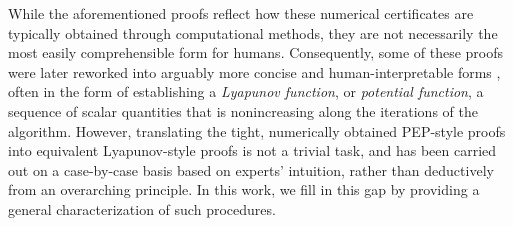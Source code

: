\documentclass{article}
\theoremstyle{definition}
\theoremstyle{plain}
\begin{document}
While the aforementioned proofs reflect how these numerical certificates are typically obtained through computational methods, they are not necessarily the most easily comprehensible form for humans.
Consequently, some of these proofs were later reworked into arguably more concise and human-interpretable forms \citep{dAspremontScieurTaylor2021_acceleration,ParkParkRyu2023_factorsqrt2,DiakonikolasWang2022_potential,LeeParkRyu2021_geometric,Diakonikolas2020_halpern,TeboulleVaisbourd2023_elementary},
often in the form of establishing a \emph{Lyapunov function}, or \emph{potential function}, a sequence of scalar quantities that is nonincreasing along the iterations of the algorithm.
However, translating the tight, numerically obtained PEP-style proofs into equivalent Lyapunov-style proofs is not a trivial task, and has been carried out on a case-by-case basis based on experts' intuition, rather than deductively from an overarching principle.
In this work, we fill in this gap by providing a general characterization of such procedures.
\end{document}
